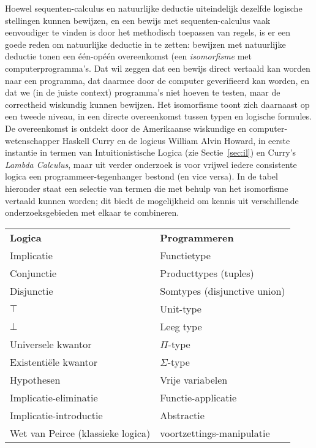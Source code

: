 Hoewel sequenten-calculus en natuurlijke deductie uiteindelijk dezelfde logische stellingen kunnen bewijzen, en een bewijs met sequenten-calculus vaak eenvoudiger te vinden is door het methodisch toepassen van regels, is er een goede reden om natuurlijke deductie in te zetten: bewijzen met natuurlijke deductie tonen een \'e\'en-op\'e\'en overeenkomst (een \emph{isomorfisme} met computerprogramma's. Dat wil zeggen dat een bewijs direct vertaald kan worden naar een programma, dat daarmee door de computer geverifieerd kan worden, en dat we (in de juiste context) programma's niet hoeven te testen, maar de correctheid wiskundig kunnen bewijzen. Het isomorfisme toont zich daarnaast op een tweede niveau, in een directe overeenkomst tussen typen en logische formules. De overeenkomst is ontdekt door de Amerikaanse wiskundige en computer-wetenschapper Haskell Curry en de logicus William Alvin Howard, in eerste instantie in termen van Intuitionistische Logica (zie Sectie~\ref{sec:il}) en Curry's \emph{Lambda Calculus}, maar uit verder onderzoek is voor vrijwel iedere consistente logica een programmeer-tegenhanger bestond (en vice versa). In de tabel hieronder staat een selectie van termen die met behulp van het isomorfisme vertaald kunnen worden; dit biedt de mogelijkheid om kennis uit verschillende onderzoeksgebieden met elkaar te combineren.\\[5mm]

\begin{tabular}{l l}
  \bf Logica & \bf Programmeren \\
  Implicatie & Functietype \\
  Conjunctie & Producttypes (tuples) \\
  Disjunctie & Somtypes (disjunctive union) \\
  $\top$ & Unit-type \\
  $\bot$ & Leeg type \\
  Universele kwantor & $\Pi$-type \\
  Existenti\"ele kwantor & $\Sigma$-type \\
  Hypothesen & Vrije variabelen \\
  Implicatie-eliminatie & Functie-applicatie \\
  Implicatie-introductie & Abstractie \\
  Wet van Peirce (klassieke logica) & voortzettings-manipulatie \\
\end{tabular}\\[5mm]


